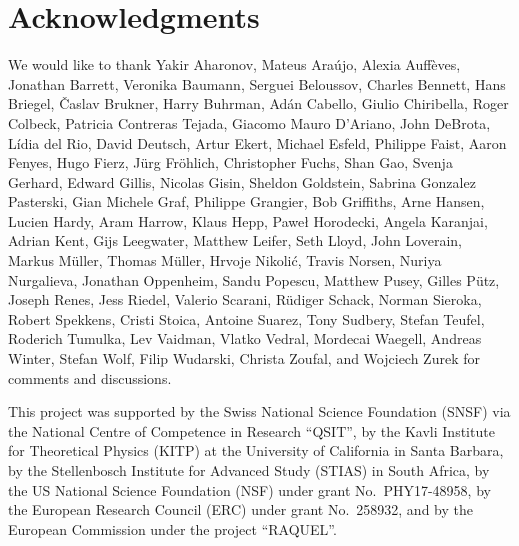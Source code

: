 \documentclass{article}
\theoremstyle{mystyle}
\theoremstyle{definition}
\begin{document}
\section*{Acknowledgments}

We would like to thank Yakir Aharonov, Mateus Ara\'ujo, Alexia Auff\`eves, Jonathan Barrett, Veronika Baumann, Serguei Beloussov, Charles Bennett, Hans Briegel, \v{C}aslav Brukner, Harry Buhrman, Ad\'an Cabello, Giulio Chiribella, Roger Colbeck, Patricia Contreras Tejada, Giacomo Mauro D'Ariano,  John DeBrota, L\'idia del Rio, David Deutsch, Artur Ekert, Michael Esfeld, Philippe Faist, Aaron Fenyes, Hugo Fierz, J\"urg Fr\"ohlich, Christopher Fuchs, Shan Gao, Svenja Gerhard, Edward Gillis, Nicolas Gisin,  Sheldon Goldstein, Sabrina Gonzalez Pasterski, Gian Michele Graf, Philippe Grangier, Bob Griffiths,  Arne Hansen, Lucien Hardy, Aram Harrow, Klaus Hepp, Pawe\l{} Horodecki, Angela Karanjai, Adrian Kent, Gijs Leegwater, Matthew Leifer, Seth Lloyd, John Loverain, Markus M\"uller, Thomas M\"uller, Hrvoje Nikoli\'c, Travis Norsen, Nuriya Nurgalieva, Jonathan Oppenheim, Sandu Popescu, Matthew Pusey, Gilles P\"utz, Joseph Renes, Jess Riedel, Valerio Scarani, R\"udiger Schack, Norman Sieroka, Robert Spekkens, Cristi Stoica, Antoine Suarez, Tony Sudbery, Stefan Teufel, Roderich Tumulka, Lev Vaidman, Vlatko Vedral, Mordecai Waegell, Andreas Winter, Stefan Wolf, Filip Wudarski,  Christa Zoufal, and Wojciech Zurek for comments and discussions.

This project was supported by the Swiss National Science Foundation (SNSF) via the National Centre of Competence in Research ``QSIT'', by the Kavli Institute for Theoretical Physics (KITP) at the University of California in Santa Barbara, by the Stellenbosch Institute for Advanced Study (STIAS) in South Africa,  by the US National Science Foundation (NSF) under grant No.\ PHY17-48958, by the European Research Council (ERC) under grant No.\ 258932,  and by the European Commission under the project ``RAQUEL''.  



\end{document}
